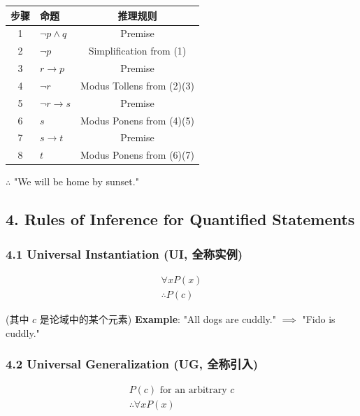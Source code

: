 \documentclass[10pt,a4paper,openany]{ctexbook}
\theoremstyle{definition}
\theoremstyle{remark}
\begin{document}
\begin{center}
\begin{tabular}{clc}
\hline
步骤 & 命题 & 推理规则 \\ \hline
1 & $\neg p \land q$ & Premise \\
2 & $\neg p$ & Simplification from (1) \\
3 & $r \to p$ & Premise \\
4 & $\neg r$ & Modus Tollens from (2)(3) \\
5 & $\neg r \to s$ & Premise \\
6 & $s$ & Modus Ponens from (4)(5) \\
7 & $s \to t$ & Premise \\
8 & $t$ & Modus Ponens from (6)(7) \\
\hline
\end{tabular}

\end{center}

$\therefore$ "We will be home by sunset."
\vspace{-2pt}

\subsection{4. Rules of Inference for Quantified Statements}

\subsubsection{4.1 Universal Instantiation (UI, 全称实例)}

\[
\begin{array}{c}
\forall x P(x) \\
\hline
\therefore P(c)
\end{array}
\]

(其中 $c$ 是论域中的某个元素)
\textbf{Example}: "All dogs are cuddly." $\implies$ "Fido is cuddly."
\vspace{-2pt}

\subsubsection{4.2 Universal Generalization (UG, 全称引入)}

\[
\begin{array}{c}
P(c) \text{ for an arbitrary } c \\
\hline
\therefore \forall x P(x)
\end{array}
\]
\end{document}
